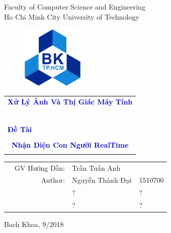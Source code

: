 \documentclass[a4paper]{article}
\begin{document}
\begin{titlepage}
\begin{center}
Faculty of Computer Science and Engineering\\
Ho Chi Minh City University of Technology
\end{center}

\vspace{.51cm}

\begin{figure}[h!]
\begin{center}
\includegraphics[width=3cm]{LogoBK.jpg}
\end{center}
\end{figure}

\vspace{0.5cm}


\begin{center}
\begin{tabular}{c}
\multicolumn{1}{l}{\textbf{{\Large \textcolor{blue}{Xử Lý Ảnh Và Thị Giác Máy Tính}}}}\\
~~\\
\hline
\\
\multicolumn{1}{l}{\textbf{{\Large \textcolor{blue}{Đề Tài}}}}\\
\\
\textbf{{\Huge \textcolor{blue}{Nhận Diện Con Người RealTime}}}\\
\\
\hline
\end{tabular}
\end{center}

\vspace{3cm}

\begin{table}[h]
\begin{tabular}{rrll}
\hspace{5 cm} & GV Hướng Dẫn: & Trần Tuấn Anh &\\
& Author: & Nguyễn Thành Đạt & 1510700 \\
& & ? & ? \\ 
& & ?& ?\\ 
\end{tabular}
\end{table}

\begin{center}
{\footnotesize Bach Khoa, 9/2018}
\end{center}
\end{titlepage}
\end{document}
